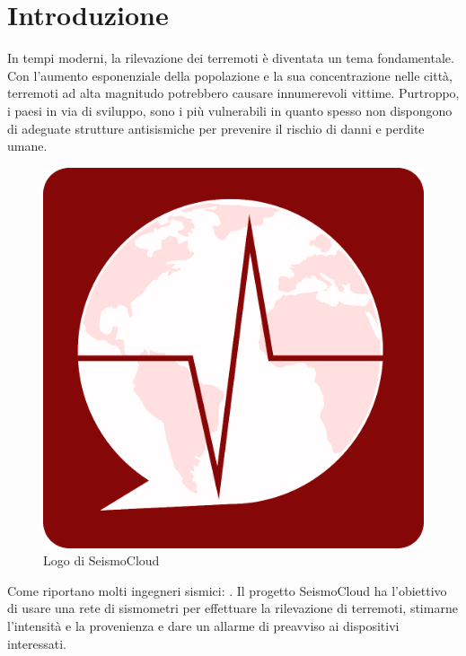 \documentclass[main.tex]{subfiles}
\begin{document}
\sloppy


\vspace{1.0cm}

\section{Introduzione}\label{sec:Introduzione}
In tempi moderni, la rilevazione dei terremoti è diventata un tema fondamentale. Con l'aumento esponenziale della popolazione e la sua concentrazione nelle città, terremoti ad alta magnitudo potrebbero causare innumerevoli vittime. Purtroppo, i paesi in via di sviluppo, sono i più vulnerabili in  quanto spesso non dispongono di adeguate strutture antisismiche per prevenire il rischio di danni e perdite umane.
\begin{figure}
    \centering
    \captionsetup{justification=centering}
    \includegraphics[scale=0.15]{img/introduzione/seismocloud.png}
    \caption{Logo di SeismoCloud}
    \label{fig:seismologo}
\end{figure}
Come riportano molti ingegneri sismici: .\newline
Il progetto SeismoCloud ha l'obiettivo di usare una rete di sismometri per effettuare la rilevazione di terremoti, stimarne l'intensità e la provenienza e dare un allarme di preavviso ai dispositivi interessati.
\end{document}
